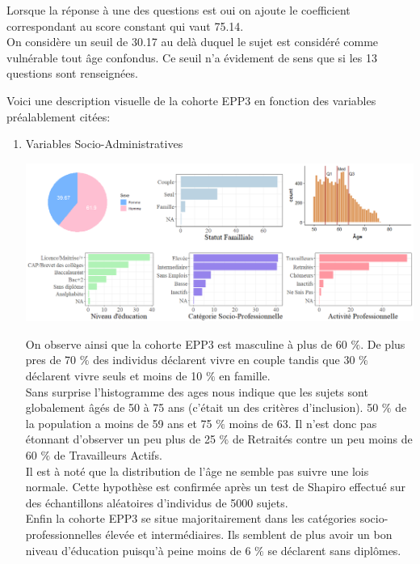 \documentclass{book}
\begin{document}
\noindent
Lorsque la réponse à une des questions est oui on ajoute le coefficient correspondant au score constant qui vaut 75.14.\\
On considère un seuil de 30.17 au delà duquel le sujet est considéré comme vulnérable tout âge confondus. Ce seuil n'a évidement de sens que si les 13 questions sont renseignées.\\

\newpage

\noindent
Voici une description visuelle de la cohorte EPP3 en fonction des variables préalablement citées:\\

\begin{enumerate}
\item Variables Socio-Administratives
\begin{center}
\includegraphics[scale=.4]{tab_var_socio_ad.png}
\end{center}
On observe ainsi que la cohorte EPP3 est masculine à plus de 60 $\%$. De plus pres de 70 $\%$ des individus déclarent vivre en couple tandis que 30 $\%$  déclarent vivre seuls et moins de 10 $\%$ en famille.\\

\noindent
Sans surprise l'histogramme des ages nous indique que les sujets sont globalement âgés de 50 à 75 ans (c'était un des critères d'inclusion). 50 $\%$ de la population a moins de 59 ans et 75 $\%$ moins de 63. Il n'est donc pas étonnant d'observer un peu plus de 25 $\%$ de Retraités contre un peu moins de 60 $\%$ de Travailleurs Actifs.\\

\noindent
Il est à noté que la distribution de l'âge ne semble pas suivre une lois normale. Cette hypothèse est confirmée après un test de Shapiro effectué sur des échantillons aléatoires d'individus de 5000 sujets.\\

Enfin la cohorte EPP3 se situe majoritairement dans les catégories socio-professionnelles élevée et intermédiaires.
Ils semblent de plus avoir un bon niveau d'éducation puisqu'à peine moins de 6 $\%$ se déclarent sans diplômes.\\


\end{enumerate}
\end{document}
